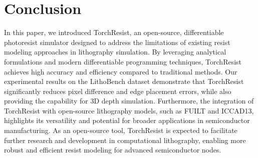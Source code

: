 \section{Conclusion}

In this paper, we introduced TorchResist, an open-source, differentiable photoresist simulator designed to address the limitations of existing resist modeling approaches in lithography simulation. By leveraging analytical formulations and modern differentiable programming techniques, TorchResist achieves high accuracy and efficiency compared to traditional methods. Our experimental results on the LithoBench dataset demonstrate that TorchResist significantly reduces pixel difference and edge placement errors, while also providing the capability for 3D depth simulation. Furthermore, the integration of TorchResist with open-source lithography models, such as FUILT and ICCAD13, highlights its versatility and potential for broader applications in semiconductor manufacturing. As an open-source tool, TorchResist is expected to facilitate further research and development in computational lithography, enabling more robust and efficient resist modeling for advanced semiconductor nodes.